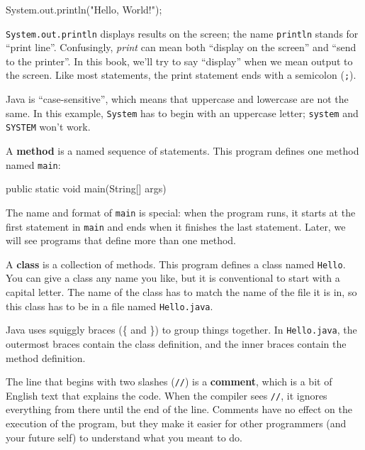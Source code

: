 \documentclass[12pt]{book}
\theoremstyle{exercise}
\newcommand{\java}[1]{\verb"#1"}
\begin{document}
\begin{code}
    System.out.println("Hello, World!");
\end{code}


\java{System.out.println} displays results on the screen; the name \java{println} stands for ``print line''.
Confusingly, {\em print} can mean both ``display on the screen'' and ``send to the printer''.
In this book, we'll try to say ``display'' when we mean output to the screen.
Like most statements, the print statement ends with a semicolon (\java{;}).

Java is ``case-sensitive'', which means that uppercase and lowercase are not the same.
In this example, \java{System} has to begin with an uppercase letter; \java{system} and \java{SYSTEM} won't work.


A {\bf method} is a named sequence of statements.
This program defines one method named \java{main}:

\begin{code}
    public static void main(String[] args)
\end{code}


The name and format of \java{main} is special: when the program runs, it starts at the first statement in \java{main} and ends when it finishes the last statement.
Later, we will see programs that define more than one method.


A {\bf class} is a collection of methods.
This program defines a class named \java{Hello}.
You can give a class any name you like, but it is conventional to start with a capital letter.
The name of the class has to match the name of the file it is in, so this class has to be in a file named \java{Hello.java}.


Java uses squiggly braces (\{ and \}) to group things together.
In {\tt Hello.java}, the outermost braces contain the class definition, and the inner braces contain the method definition.


The line that begins with two slashes (\java{//}) is a {\bf comment}, which is a bit of English text that explains the code.
When the compiler sees \java{//}, it ignores everything from there until the end of the line.
Comments have no effect on the execution of the program, but they make it easier for other programmers (and your future self) to understand what you meant to do.
\end{document}
